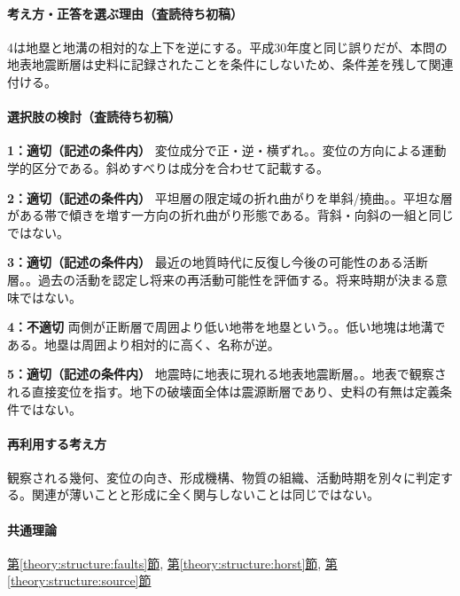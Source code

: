 \paragraph{考え方・正答を選ぶ理由（査読待ち初稿）} 4は地塁と地溝の相対的な上下を逆にする。平成30年度と同じ誤りだが、本問の地表地震断層は史料に記録されたことを条件にしないため、条件差を残して関連付ける。

\paragraph{選択肢の検討（査読待ち初稿）}\mbox{}\par

\noindent\textbf{1：適切（記述の条件内）} 変位成分で正・逆・横ずれ。。変位の方向による運動学的区分である。斜めすべりは成分を合わせて記載する。\par

\noindent\textbf{2：適切（記述の条件内）} 平坦層の限定域の折れ曲がりを単斜/撓曲。。平坦な層がある帯で傾きを増す一方向の折れ曲がり形態である。背斜・向斜の一組と同じではない。\par

\noindent\textbf{3：適切（記述の条件内）} 最近の地質時代に反復し今後の可能性のある活断層。。過去の活動を認定し将来の再活動可能性を評価する。将来時期が決まる意味ではない。\par

\noindent\textbf{4：不適切} 両側が正断層で周囲より低い地帯を地塁という。。低い地塊は地溝である。地塁は周囲より相対的に高く、名称が逆。\par

\noindent\textbf{5：適切（記述の条件内）} 地震時に地表に現れる地表地震断層。。地表で観察される直接変位を指す。地下の破壊面全体は震源断層であり、史料の有無は定義条件ではない。\par

\paragraph{再利用する考え方} 観察される幾何、変位の向き、形成機構、物質の組織、活動時期を別々に判定する。関連が薄いことと形成に全く関与しないことは同じではない。

\paragraph{共通理論} \hyperref[theory:structure:faults]{第\ref*{theory:structure:faults}節}, \hyperref[theory:structure:horst]{第\ref*{theory:structure:horst}節}, \hyperref[theory:structure:source]{第\ref*{theory:structure:source}節}

